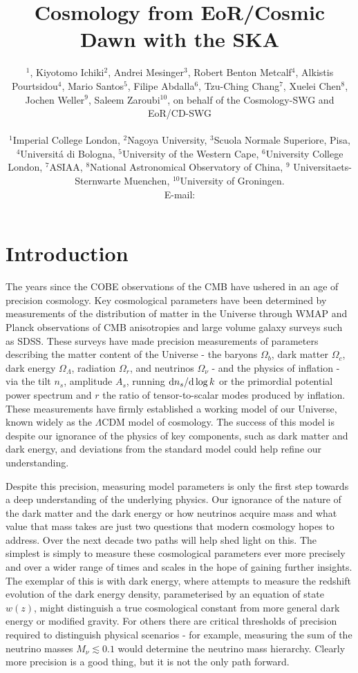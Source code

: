 \documentclass{PoS}
\title{Cosmology from EoR/Cosmic Dawn with the SKA}
\author{\speaker{Jonathan Pritchard}$^1$, Kiyotomo Ichiki$^2$, Andrei Mesinger$^3$, Robert Benton Metcalf$^4$, Alkistis Pourtsidou$^4$, Mario Santos$^5$, Filipe Abdalla$^6$, Tzu-Ching Chang$^7$, Xuelei Chen$^8$, Jochen Weller$^{9}$, Saleem Zaroubi$^{10}$,
on behalf of the Cosmology-SWG and EoR/CD-SWG


        

\\
        $^1$Imperial College London,
        $^2$Nagoya University,
        $^3$Scuola Normale Superiore, Pisa,
        $^4$Universit\'{a} di Bologna,
        $^5$University of the Western Cape,
        $^6$University College London,
        $^7$ASIAA,
        $^8$National Astronomical Observatory of China,
        $^{9}$ Universitaets-Sternwarte Muenchen,
        $^{10}$University of Groningen.
        \\
        E-mail: \email{j.pritchard@imperial.ac.uk}}
\newcommand{\ud}{{\rm d}}
\begin{document}
\section{Introduction}

The years since the COBE observations of the CMB have ushered in an age of precision cosmology. Key cosmological parameters have been determined by measurements of the distribution of matter in the Universe through WMAP and Planck observations of CMB anisotropies and large volume galaxy surveys such as SDSS. These surveys have made precision measurements of parameters describing the matter content of the Universe - the baryons $\Omega_b$, dark matter $\Omega_c$, dark energy $\Omega_\Lambda$, radiation $\Omega_r$, and neutrinos $\Omega_\nu$ - and the physics of inflation - via the tilt $n_s$, amplitude $A_s$, running $\ud n_s/\ud\log k$ or the primordial potential power spectrum and $r$ the ratio of tensor-to-scalar modes produced by inflation. These measurements have firmly established a working model of our Universe, known widely as the $\Lambda$CDM model of cosmology. The success of this model is despite our ignorance of the physics of key components, such as dark matter and dark energy, and deviations from the standard model could help refine our understanding.

Despite this precision, measuring model parameters is only the first step towards a deep understanding of the underlying physics. Our ignorance of the nature of the dark matter and the dark energy or how neutrinos acquire mass and what value that mass takes are just two questions that modern cosmology hopes to address. Over the next decade two paths will help shed light on this. The simplest is simply to measure these cosmological parameters ever more precisely and over a wider range of times and scales in the hope of gaining further insights. The exemplar of this is with dark energy, where attempts to measure the redshift evolution of the dark energy density, parameterised by an equation of state $w(z)$, might distinguish a true cosmological constant from more general dark energy or modified gravity. For others there are critical thresholds of precision required to distinguish physical scenarios - for example, measuring the sum of the neutrino masses $M_\nu\lesssim0.1$ would determine the neutrino mass hierarchy. Clearly more precision is a good thing, but it is not the only path forward.
\end{document}
